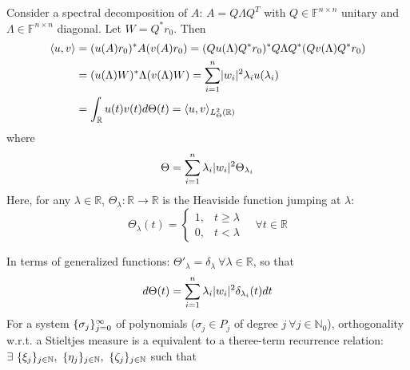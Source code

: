 \documentclass[12pt]{article}
\theoremstyle{definition}
\theoremstyle{remark}
\numberwithin{equation}{section}
\newcommand{\F}{\mathbb{F}}
\newcommand{\R}{\mathbb{R}}
\newcommand{\N}{\mathbb{N}}
\DeclarePairedDelimiter{\set}{\{}{\}}
\DeclarePairedDelimiter{\abs}{\lvert}{\rvert}
\DeclarePairedDelimiter{\iprod}{\langle}{\rangle}
\begin{document}
Consider a spectral decomposition of $A$: $A = Q \Lambda Q^T$ with $Q \in \F^{n\times n}$ unitary and $\Lambda \in \F^{n\times n}$ diagonal. Let $W = Q^* r_0$. Then
\begin{align*}
  \langle u, v \rangle &= (u(A) r_0)^* A (v(A) r_0) = (Qu(\Lambda)Q^* r_0)^* Q \Lambda Q^* (Qv(\Lambda)Q^*r_0) \\
  &= (u(\Lambda)W)^* \Lambda (v(\Lambda)W) = \sum_{i=1}^n \abs{w_i}^2 \lambda_i u(\lambda_i) \\
  &= \int_\R u(t)v(t) d\Theta(t) = \iprod{u,v}_{L^2_\Theta(\R)}
\end{align*}
where
\begin{equation*}
  \Theta = \sum_{i=1}^n \lambda_i \abs{w_i}^2 \Theta_{\lambda_i}
\end{equation*}
Here, for any $\lambda \in \R$, $\Theta_\lambda: \R \rightarrow \R$ is the Heaviside function jumping at $\lambda$:
\begin{equation*}
  \Theta_\lambda(t) =
  \begin{cases}
    1, & t \geq \lambda \\
    0, & t < \lambda
  \end{cases}
  \quad \forall t \in \R
\end{equation*}

In terms of generalized functions: $\Theta'_\lambda = \delta_\lambda\ \forall \lambda \in \R$, so that
\begin{equation*}
  d\Theta(t) = \sum_{i=1}^n \lambda_i \abs{w_i}^2 \delta_{\lambda_i}(t) dt
\end{equation*}
For a system $\set{\sigma_j}_{j=0}^{\infty}$ of polynomials ($\sigma_j \in P_j$ of degree $j\ \forall j \in \N_0$), orthogonality w.r.t. a Stieltjes measure is a equivalent to a theree-term recurrence relation: $\exists\ \set{\xi_j}_{j\in \N},\ \set{\eta_j}_{j\in \N},\ \set{\zeta_j}_{j\in \N}$ such that
\end{document}
